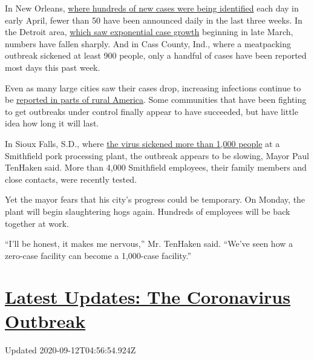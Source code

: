 In New Orleans,
\href{https://www.nytimes3xbfgragh.onion/2020/03/26/us/coronavirus-louisiana-new-orleans.html}{where
hundreds of new cases were being identified} each day in early April,
fewer than 50 have been announced daily in the last three weeks. In the
Detroit area,
\href{https://www.nytimes3xbfgragh.onion/2020/03/30/us/coronavirus-detroit.html}{which
saw exponential case growth} beginning in late March, numbers have
fallen sharply. And in Cass County, Ind., where a meatpacking outbreak
sickened at least 900 people, only a handful of cases have been reported
most days this past week.

Even as many large cities saw their cases drop, increasing infections
continue to be
\href{https://www.nytimes3xbfgragh.onion/interactive/2020/04/08/us/coronavirus-rural-america-cases.html}{reported
in parts of rural America}. Some communities that have been fighting to
get outbreaks under control finally appear to have succeeded, but have
little idea how long it will last.

In Sioux Falls, S.D., where
\href{https://www.nytimes3xbfgragh.onion/2020/04/15/us/coronavirus-south-dakota-meat-plant-refugees.html}{the
virus sickened more than 1,000 people} at a Smithfield pork processing
plant, the outbreak appears to be slowing, Mayor Paul TenHaken said.
More than 4,000 Smithfield employees, their family members and close
contacts, were recently tested.

Yet the mayor fears that his city's progress could be temporary. On
Monday, the plant will begin slaughtering hogs again. Hundreds of
employees will be back together at work.

``I'll be honest, it makes me nervous,'' Mr. TenHaken said. ``We've seen
how a zero-case facility can become a 1,000-case facility.''

\hypertarget{latest-updates-the-coronavirus-outbreak}{%
\section{\texorpdfstring{\href{https://www.nytimes3xbfgragh.onion/2020/09/11/world/covid-19-coronavirus.html?action=click\&pgtype=Article\&state=default\&region=MAIN_CONTENT_1\&context=storylines_live_updates}{Latest
Updates: The Coronavirus
Outbreak}}{Latest Updates: The Coronavirus Outbreak}}\label{latest-updates-the-coronavirus-outbreak}}

Updated 2020-09-12T04:56:54.924Z

